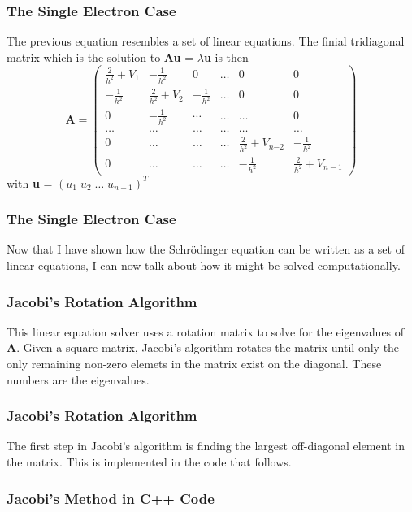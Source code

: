 \documentclass[10pt,xcolor={x11names}]{beamer}
\begin{document}
		\begin{frame} \frametitle{The Single Electron Case}
			The previous equation resembles a set of linear equations.
			The finial tridiagonal matrix which is the solution to \textbf{Au} = $\lambda$\textbf{u} is then
    		\[ \textbf{A} = 
    		\left( \begin{array}{cccccc} 
    		\frac{2}{h^2}+V_1 & -\frac{1}{h^2}   & 0    & \dots  &0     & 0 \\
   		 	-\frac{1}{h^2} & \frac{2}{h^2}+V_2 &  -\frac{1}{h^2}   & \dots  &0     &0 \\
    		0   & -\frac{1}{h^2} &  \cdots  & \dots      &\dots & 0\\
    		\dots  & \dots  & \dots  &\dots      &\dots & \dots\\
    		0   & \dots & \dots  &\dots       &\frac{2}{h^2}+V_{n{-2}} & -\frac{1}{h^2}\\
    		0   & \dots & \dots  &\dots       &-\frac{1}{h^2} & \frac{2}{h^2}+V_{n-1}
    		\end{array} \right)  
    		\]
    		with \textbf{u} = $(u_1 \; u_2 \; \dots \; u_{n-1})^T$
		\end{frame}

		\begin{frame} \frametitle{The Single Electron Case}
			Now that I have shown how the Schr\"{o}dinger equation can be written as a set of linear equations, I can now talk about how it might be solved computationally.
		\end{frame}

		\begin{frame} \frametitle{Jacobi's Rotation Algorithm}
			This linear equation solver uses a rotation matrix to solve for the eigenvalues of \textbf{A}. Given a square matrix, Jacobi's algorithm rotates the matrix until only the only remaining non-zero elemets in the matrix exist on the diagonal. These numbers are the eigenvalues.
		\end{frame}

		\begin{frame} \frametitle{Jacobi's Rotation Algorithm}
			The first step in Jacobi's algorithm is finding the largest off-diagonal element in the matrix. This is implemented in the code that follows.
		\end{frame}

		\begin{frame} \frametitle{Jacobi's Method in C++ Code}
			
		\end{frame}
\end{document}
